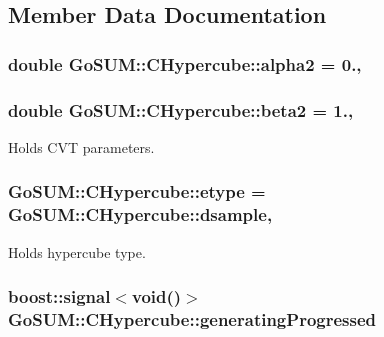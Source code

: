 \subsection{Member Data Documentation}
\hypertarget{class_go_s_u_m_1_1_c_hypercube_a88f945378fe038456780cdc88aeaadd0}{
\subsubsection[{alpha2}]{\setlength{\rightskip}{0pt plus 5cm}double Go\-S\-U\-M\-::\-C\-Hypercube\-::alpha2 = 0.\hspace{0.3cm}{\ttfamily [static]}, {\ttfamily [protected]}}}\label{class_go_s_u_m_1_1_c_hypercube_a88f945378fe038456780cdc88aeaadd0}
\hypertarget{class_go_s_u_m_1_1_c_hypercube_a674776d76c1fd0d53a25975b057198f9}{
\subsubsection[{beta2}]{\setlength{\rightskip}{0pt plus 5cm}double Go\-S\-U\-M\-::\-C\-Hypercube\-::beta2 = 1.\hspace{0.3cm}{\ttfamily [static]}, {\ttfamily [protected]}}}\label{class_go_s_u_m_1_1_c_hypercube_a674776d76c1fd0d53a25975b057198f9}
Holds C\-V\-T parameters. \hypertarget{class_go_s_u_m_1_1_c_hypercube_a8f9d864e2940c4982480ea394931fcf5}{
\subsubsection[{etype}]{ Go\-S\-U\-M\-::\-C\-Hypercube\-::etype = {\bf Go\-S\-U\-M\-::\-C\-Hypercube\-::dsample}\hspace{0.3cm}{\ttfamily [static]}, {\ttfamily [protected]}}}\label{class_go_s_u_m_1_1_c_hypercube_a8f9d864e2940c4982480ea394931fcf5}


Holds hypercube type. 

\hypertarget{class_go_s_u_m_1_1_c_hypercube_aae23731c5d5e5faf5881fc7c28542656}{
\subsubsection[{generating\-Progressed}]{\setlength{\rightskip}{0pt plus 5cm}boost\-::signal$<$void()$>$ Go\-S\-U\-M\-::\-C\-Hypercube\-::generating\-Progressed}}\label{class_go_s_u_m_1_1_c_hypercube_aae23731c5d5e5faf5881fc7c28542656}


